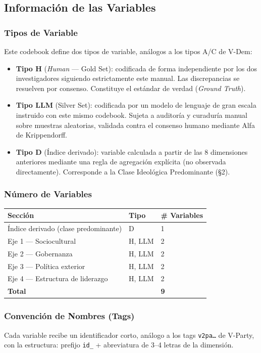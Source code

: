 \documentclass[11pt,letterpaper]{article}
\begin{document}
\subsection{Información de las Variables}

\subsubsection{Tipos de Variable}
Este codebook define dos tipos de variable, análogos a los tipos A/C de V-Dem:
\begin{itemize}
\item \textbf{Tipo H} (\emph{Human} — Gold Set): codificada de forma independiente por los dos
investigadores siguiendo estrictamente este manual. Las discrepancias se resuelven por consenso.
Constituye el estándar de verdad (\emph{Ground Truth}).
\item \textbf{Tipo LLM} (Silver Set): codificada por un modelo de lenguaje de gran escala instruido con este
mismo codebook. Sujeta a auditoría y curaduría manual sobre muestras aleatorias, validada contra el
consenso humano mediante Alfa de Krippendorff.
\item \textbf{Tipo D} (Índice derivado): variable calculada a partir de las 8 dimensiones anteriores mediante
una regla de agregación explícita (no observada directamente). Corresponde a la Clase Ideológica
Predominante (§2).
\end{itemize}

\subsubsection{Número de Variables}
\begin{longtable}{@{}p{7.2cm}p{3.2cm}p{3.0cm}@{}}
\toprule
\textbf{Sección} & \textbf{Tipo} & \textbf{\# Variables}\\
\midrule\endhead
Índice derivado (clase predominante) & D & 1\\
Eje 1 — Sociocultural & H, LLM & 2\\
Eje 2 — Gobernanza & H, LLM & 2\\
Eje 3 — Política exterior & H, LLM & 2\\
Eje 4 — Estructura de liderazgo & H, LLM & 2\\
\midrule
\textbf{Total} & & \textbf{9}\\
\bottomrule
\end{longtable}

\subsubsection{Convención de Nombres (Tags)}
Cada variable recibe un identificador corto, análogo a los tags \texttt{v2pa…} de V-Party, con la estructura:
prefijo \texttt{id\_} + abreviatura de 3–4 letras de la dimensión.
\end{document}
